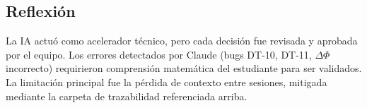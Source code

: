 \subsection*{Reflexión}

La IA actuó como acelerador técnico, pero cada decisión fue revisada
y aprobada por el equipo.
Los errores detectados por Claude (bugs DT-10, DT-11, $\Delta\Phi$
incorrecto) requirieron comprensión matemática del estudiante para ser
validados.
La limitación principal fue la pérdida de contexto entre sesiones,
mitigada mediante la carpeta de trazabilidad referenciada arriba.
